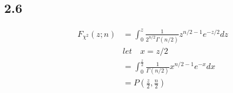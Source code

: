 \documentclass{article}
\begin{document}
\begin{CJK*}{GBK}{song}
\section{2.6}
\begin{equation}
\begin{aligned}
F_{\chi^2}(z;n)&=\int_0^z\frac{1}{2^{n/2}\Gamma(n/2)}z^{n/2-1}e^{-z/2}dz\\
&let \quad x=z/2\\
&=\int_0^{\frac{z}{2}}\frac{1}{\Gamma(n/2)}x^{n/2-1}e^{-x}dx\\
&=P(\frac{z}{2},\frac{n}{2})
\end{aligned}
\end{equation}






\end{CJK*}
\end{document}
